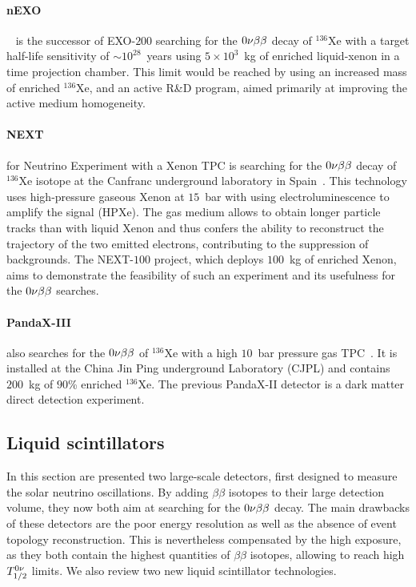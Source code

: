 \paragraph{nEXO}~\cite{unknown:nEXO_2018} is the successor of EXO-$200$ searching for the $0\nu\beta\beta$ decay of $^{136}$Xe with a target half-life sensitivity of $\sim 10^{28}$~years using $5\times 10^3$~kg of enriched liquid-xenon in a time projection chamber.
This limit would be reached by using an increased mass of enriched $^{136}$Xe, and an active R\&D program, aimed primarily at improving the active medium homogeneity.

\paragraph{NEXT} for Neutrino Experiment with a Xenon TPC is searching for the $0\nu\beta\beta$ decay of $^{136}$Xe isotope at the Canfranc underground laboratory in Spain~\cite{art:NEXT_2016}.
This technology uses high-pressure gaseous Xenon at $15$~bar with using electroluminescence to amplify the signal (HPXe).
The gas medium allows to obtain longer particle tracks than with liquid Xenon and thus confers the ability to reconstruct the trajectory of the two emitted electrons, contributing to the suppression of backgrounds.
The NEXT-$100$ project, which deploys $100$~kg of enriched Xenon, aims to demonstrate the feasibility of such an experiment and its usefulness for the $0\nu\beta\beta$ searches.


\paragraph{PandaX-III} also searches for the $0\nu\beta\beta$ of $^{136}$Xe with a high $10$~bar pressure gas TPC~\cite{art:PANDA_2016}.
It is installed at the China Jin Ping underground Laboratory (CJPL) and contains $200$~kg of $90$\% enriched $^{136}$Xe.
The previous PandaX-II detector is a dark matter direct detection experiment.

\subsection{Liquid scintillators}
\label{subsec:scintillators}

In this section are presented two large-scale detectors, first designed to measure the solar neutrino oscillations.
By adding $\beta\beta$ isotopes to their large detection volume, they now both aim at searching for the $0\nu\beta\beta$ decay.
The main drawbacks of these detectors are the poor energy resolution as well as the absence of event topology reconstruction.
This is nevertheless compensated by the high exposure, as they both contain the highest quantities of $\beta\beta$ isotopes, allowing to reach high $T_{1/2}^{0\nu}$ limits.
We also review two new liquid scintillator technologies.

